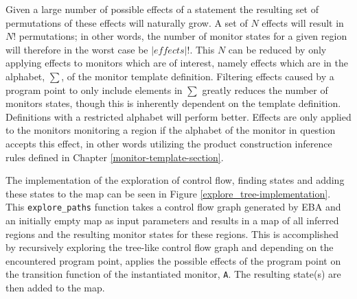 \newpar Given a large number of possible effects of a statement the resulting set of permutations of these effects will naturally grow. A set of $N$ effects will result in $N!$ permutations; in other words, the number of monitor states for a given region will therefore in the worst case be $|\mathit{effects}|!$. This $N$ can be reduced by only applying effects to monitors which are of interest, namely effects which are in the alphabet, $\sum$, of the monitor template definition. Filtering effects caused by a program point to only include elements in $\sum$ greatly reduces the number of monitors states, though this is inherently dependent on the template definition. Definitions with a restricted alphabet will perform better. Effects are only applied to the monitors monitoring a region if the alphabet of the monitor in question accepts this effect, in other words utilizing the product construction inference rules defined in Chapter \ref{monitor-template-section}. 

\newpar The implementation of the exploration of control flow, finding states and adding these states to the map can be seen in Figure \ref{explore_tree-implementation}. This \texttt{explore\_paths} function takes a control flow graph generated by EBA and an initially empty map as input parameters and results in a map of all inferred regions and the resulting monitor states for these regions. This is accomplished by recursively exploring the tree-like control flow graph and depending on the encountered program point, applies the possible effects of the program point on the transition function of the instantiated monitor, \texttt{A}. The resulting state(s) are then added to the map. 

